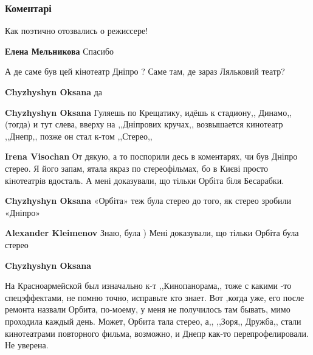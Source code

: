  
 
 
 
 
\subsubsection{Коментарі}
\label{sec:09_12_2021.fb.fb_group.story_kiev_ua.1.pamjati_eldara_rjazanova.cmt}

\begin{itemize} %
Как поэтично отозвались о режиссере!

\textbf{Елена Мельникова} Спасибо

А де саме був цей кінотеатр Дніпро ?
Саме там, де зараз Ляльковий театр?

\begin{itemize} %
\textbf{Chyzhyshyn Oksana} да

\textbf{Chyzhyshyn Oksana} Гуляешь по Крещатику, идёшь к стадиону,, Динамо,,(тогда) и тут слева, вверху на ,,Дніпрових кручах,, возвышается кинотеатр ,,Днепр,, позже он стал к-том ,,Стерео,,

\begin{itemize} %
\textbf{Irena Visochan}
От дякую, а то поспорили десь в коментарях, чи був Дніпро стерео.
Я його запам, ятала якраз по стереофільмах, бо в Києві просто кінотеатрів вдосталь.
А мені доказували, що тільки Орбіта біля Бесарабки.

\textbf{Chyzhyshyn Oksana} «Орбіта» теж була стерео до того, як стерео зробили «Дніпро»

\textbf{Alexander Kleimenov}
Знаю, була )
Мені доказували, що тільки Орбіта була стерео

\textbf{Chyzhyshyn Oksana} 

На Красноармейской был изначально к-т ,,Кинопанорама,, тоже с какими -то
спецэффектами, не помню точно, исправьте кто знает. Вот ,когда уже, его после
ремонта назвали Орбита, по-моему, у меня не получилось там бывать, мимо проходила
каждый день. Может, Орбита тала стерео, а,, ,,Зоря,, Дружба,, стали кинотеатрами
повторного фильма, возможно, и Днепр как-то перепрофелировали. Не уверена.



\end{itemize}
\end{itemize}
\end{itemize}

